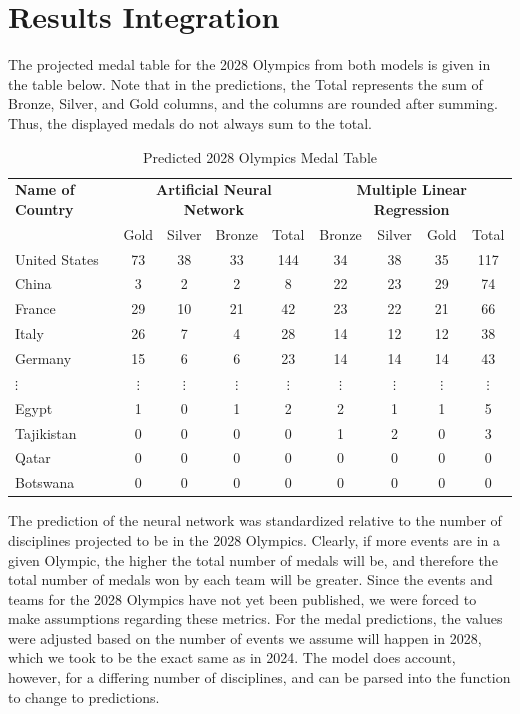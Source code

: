 \documentclass{mcmthesis}
\begin{document}
\section{Results Integration}\label{sec:results-integration}

The projected medal table for the 2028 Olympics from both models is given in the table below. Note that in the predictions, the Total represents the sum of Bronze, Silver, and Gold columns, and the columns are rounded after summing. Thus, the displayed medals do not always sum to the total.

\begin{table}[H]
\centering 
\caption{Predicted 2028 Olympics Medal Table}
\label{A}
\vspace{5pt}
\begin{tabular}{l|cccc|cccc}
\hline
\textbf{Name of Country} & 
\multicolumn{4}{c}{\textbf{Artificial Neural Network}} & 
\multicolumn{4}{c}{\textbf{Multiple Linear Regression}} \\
\cline{2-5} \cline{6-9}
& Gold & Silver & Bronze & Total & Bronze & Silver & Gold & Total \\
\hline\hline
United States & 73 & 38 & 33 & 144 & 34 & 38 & 35 & 117 \\
China         & 3 & 2 & 2 & 8   & 22 & 23 & 29 & 74 \\
France        & 29 & 10 & 21 & 42  & 23 & 22 & 21 & 66 \\
Italy         & 26 & 7 & 4 & 28  & 14 & 12 & 12 & 38 \\
Germany       & 15 & 6 & 6 & 23  & 14 & 14 & 14 & 43 \\ 
$\vdots$ & $\vdots$ & $\vdots$ & $\vdots$ & $\vdots$ & $\vdots$ & $\vdots$ & $\vdots$ & $\vdots$ \\ 
Egypt         & 1 & 0 & 1 & 2   & 2 & 1 & 1 & 5 \\
Tajikistan    & 0 & 0 & 0 & 0   & 1 & 2 & 0 & 3 \\
Qatar         & 0 & 0 & 0 & 0   & 0 & 0 & 0 & 0 \\
Botswana      & 0 & 0 & 0 & 0   & 0 & 0 & 0 & 0 \\ 
\hline
\end{tabular}
\end{table}

The prediction of the neural network was standardized relative to the number of disciplines projected to be in the 2028 Olympics. Clearly, if more events are in a given Olympic, the higher the total number of medals will be, and therefore the total number of medals won by each team will be greater. Since the events and teams for the 2028 Olympics have not yet been published, we were forced to make assumptions regarding these metrics. For the medal predictions, the values were adjusted based on the number of events we assume will happen in 2028, which we took to be the exact same as in 2024. The model does account, however, for a differing number of disciplines, and can be parsed into the function to change to predictions.
\end{document}
